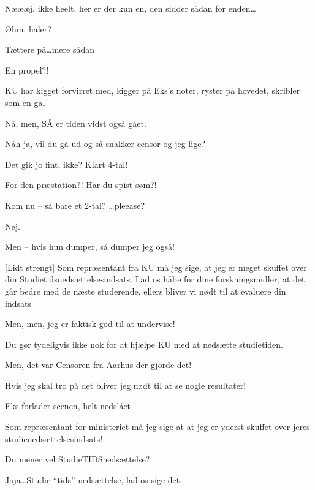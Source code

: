 \documentclass[a4paper,11pt]{article}
\begin{document}
\begin{sketch}
 Næææj, ikke heelt, her er der kun en, den sidder sådan for enden\ldots {}

Øhm, haler?

 Tættere på\ldots mere sådan 


 En propel?!


\scene KU har kigget forvirret med, kigger på Eks's noter, ryster på hovedet, skribler som en gal

Nå, men, SÅ er tiden vidst også gået.

Nåh ja, vil du gå ud og så snakker censor og jeg lige?


Det gik jo fint, ikke? Klart 4-tal!

 For den præstation?! Har du spist søm?!

 Kom nu -- så bare et 2-tal? \ldots pleease?

 Nej.

 Men -- hvis hun dumper, så dumper jeg også!

[Lidt strengt] Som repræsentant fra KU må jeg sige, at jeg er meget skuffet over din Studietidsnedsættelsesindsats. Lad os håbe for dine forskningsmidler, at det går bedre med de næste studerende, ellers bliver vi nødt til at evaluere din indsats

 Men, men, jeg er faktisk god til at undervise!

 Du gør tydeligvis ikke nok for at hjælpe KU med at nedsætte studietiden.

 Men, det var Censoren fra Aarhus der gjorde det!

 Hvis jeg skal tro på det bliver jeg nødt til at se nogle resultater! 

\scene Eks forlader scenen, helt nedslået

 Som repræsentant for ministeriet må jeg sige at at jeg er yderst skuffet over jeres studienedsættelsesindsats!

 Du mener vel StudieTIDSnedsættelse?

 Jaja\ldots Studie-``tids''-nedsættelse, lad os sige det. 


\end{sketch}
\end{document}
